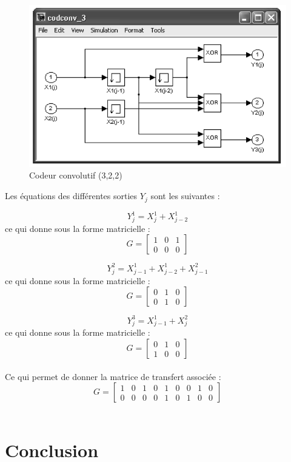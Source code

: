 \documentclass[a4paper, 12pt]{article}
\begin{document}
\begin{figure}[H]
	\centering
	\includegraphics[scale=0.8]{../codeur_convolutif_exo.png}
	\caption{Codeur convolutif (3,2,2)}
	\label{fig:cod_convolutif}
\end{figure}

Les équations des différentes sorties $Y_j$ sont les suivantes :

\[ Y_j^1 = X_{j}^1 + X_{j-2}^1 \]
ce qui donne sous la forme matricielle :
\[ G = \begin{bmatrix} 1 & 0 & 1 \\ 0 & 0 & 0 \end{bmatrix} \] 

\[ Y_j^2 = X_{j-1}^1 + X_{j-2}^1 + X_{j-1}^2 \]
ce qui donne sous la forme matricielle :
\[ G = \begin{bmatrix} 0 & 1 & 0 \\ 0 & 1 & 0 \end{bmatrix} \]

\[ Y_j^3 =  X_{j-1}^1 + X_{j}^2 \]
ce qui donne sous la forme matricielle :
\[ G = \begin{bmatrix} 0 & 1 & 0 \\ 1 & 0 & 0 \end{bmatrix} \] \\

Ce qui permet de donner la matrice de transfert associée :
\[ G = \begin{bmatrix} 1 & 0 & 1 & 0 & 1 & 0 & 0 & 1 & 0 \\ 0 & 0 & 0 & 0 & 1 & 0 & 1 & 0 & 0 \end{bmatrix} \] \\


\newpage

\section{Conclusion}
\end{document}
